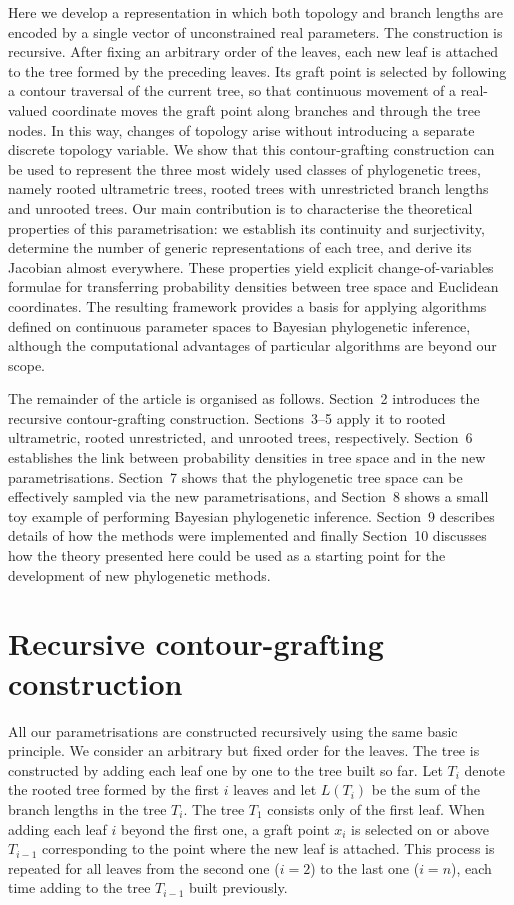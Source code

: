 \documentclass{article}
\begin{document}
Here we develop a representation in which both topology and branch
lengths are encoded by a single vector of unconstrained real parameters. The
construction is recursive. After fixing an arbitrary order of the leaves, each new leaf
is attached to the tree formed by the preceding leaves. Its graft point is
selected by following a contour traversal of the current tree, so that
continuous movement of a real-valued coordinate moves the graft point along
branches and through the tree nodes. In this way, changes of topology arise without
introducing a separate discrete topology variable.
We show that this contour-grafting construction can be used to represent
the three most widely used classes of phylogenetic trees, namely
rooted ultrametric trees,
rooted trees with unrestricted branch lengths and unrooted trees. 
Our main contribution is to characterise the theoretical properties of this parametrisation: we establish its continuity and surjectivity, determine the number of generic representations of each tree, and derive its Jacobian almost everywhere. These properties yield explicit change-of-variables formulae for transferring probability densities between tree space and Euclidean coordinates. The resulting framework provides a basis for applying algorithms defined on continuous parameter spaces to Bayesian phylogenetic inference, although the computational advantages of particular algorithms are beyond our scope.

The remainder of the article is organised as follows. Section~2 introduces
the recursive contour-grafting construction. Sections~3--5 apply it to rooted
ultrametric, rooted unrestricted, and unrooted trees, respectively. Section~6
establishes the link between probability densities in tree space and in the 
new parametrisations. Section~7 shows that the phylogenetic tree space
can be effectively sampled via the new parametrisations, and Section~8
shows a small toy example of performing Bayesian phylogenetic inference.
Section~9 describes details of how the methods were implemented
and finally Section~10 discusses how the theory presented here could be 
used as a starting point for the development of new phylogenetic methods.

\section{Recursive contour-grafting construction}

All our parametrisations are constructed recursively using the
same basic principle.
We consider an arbitrary but fixed order for the leaves.
The tree is constructed by adding each
leaf one by one to the tree built so far. 
Let $T_i$ denote the rooted tree formed by the first $i$ leaves and let
$L(T_i)$ be the sum of the branch lengths in the tree $T_i$.
The tree $T_1$ consists only of the first leaf.
When adding
each leaf $i$ beyond the first one, 
a graft point $x_i$ is selected on or above $T_{i-1}$
corresponding to the point
where the new leaf is attached. 
This process is repeated for all leaves from the second one ($i=2$) to the last one ($i=n$), each time
adding to the tree $T_{i-1}$ built previously.
\end{document}
